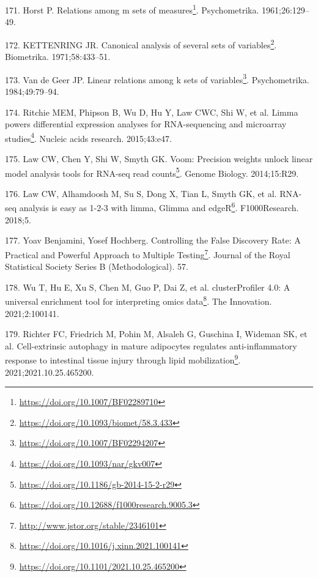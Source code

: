 \documentclass[
  a4paper,
]{book}
\DeclareRobustCommand{\href}[2]{#2\footnote{\url{#1}}}
\newlength{\cslhangindent}
\newlength{\cslentryspacingunit} %
\newenvironment{CSLReferences}[2] %
 {%
  \setlength{\parindent}{0pt}
  \ifodd #1
  \let\oldpar\par
  \def\par{\hangindent=\cslhangindent\oldpar}
  \fi
  \setlength{\parskip}{#2\cslentryspacingunit}
 }%
 {}
\begin{document}
\begin{CSLReferences}{0}{0}
\leavevmode{}%
171. Horst P. \href{https://doi.org/10.1007/BF02289710}{Relations among m sets of measures}. Psychometrika. 1961;26:129--49.

\leavevmode{}%
172. KETTENRING JR. \href{https://doi.org/10.1093/biomet/58.3.433}{Canonical analysis of several sets of variables}. Biometrika. 1971;58:433--51.

\leavevmode{}%
173. Van de Geer JP. \href{https://doi.org/10.1007/BF02294207}{Linear relations among k sets of variables}. Psychometrika. 1984;49:79--94.

\leavevmode{}%
174. Ritchie MEM, Phipson B, Wu D, Hu Y, Law CWC, Shi W, et al. \href{https://doi.org/10.1093/nar/gkv007}{Limma powers differential expression analyses for RNA-sequencing and microarray studies}. Nucleic acids research. 2015;43:e47.

\leavevmode{}%
175. Law CW, Chen Y, Shi W, Smyth GK. \href{https://doi.org/10.1186/gb-2014-15-2-r29}{Voom: Precision weights unlock linear model analysis tools for RNA-seq read counts}. Genome Biology. 2014;15:R29.

\leavevmode{}%
176. Law CW, Alhamdoosh M, Su S, Dong X, Tian L, Smyth GK, et al. \href{https://doi.org/10.12688/f1000research.9005.3}{RNA-seq analysis is easy as 1-2-3 with limma, Glimma and edgeR}. F1000Research. 2018;5.

\leavevmode{}%
177. Yoav Benjamini, Yosef Hochberg. \href{http://www.jstor.org/stable/2346101}{Controlling the False Discovery Rate: A Practical and Powerful Approach to Multiple Testing}. Journal of the Royal Statistical Society Series B (Methodological). 57.

\leavevmode{}%
178. Wu T, Hu E, Xu S, Chen M, Guo P, Dai Z, et al. \href{https://doi.org/10.1016/j.xinn.2021.100141}{clusterProfiler 4.0: A universal enrichment tool for interpreting omics data}. The Innovation. 2021;2:100141.

\leavevmode{}%
179. Richter FC, Friedrich M, Pohin M, Alsaleh G, Guschina I, Wideman SK, et al. \href{https://doi.org/10.1101/2021.10.25.465200}{Cell-extrinsic autophagy in mature adipocytes regulates anti-inflammatory response to intestinal tissue injury through lipid mobilization}. 2021;2021.10.25.465200.


\end{CSLReferences}
\end{document}
